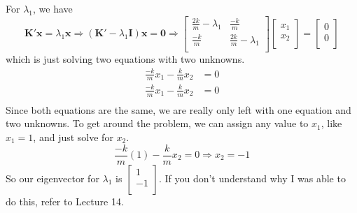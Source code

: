 \documentclass{article}
\newcommand{\be}{\begin{equation}}
\newcommand{\ee}{\end{equation}}
\newcommand{\bk}{\textbf{K}}
\begin{document}
For $\lambda_1$, we have
\be
  \bk' \textbf{x} = \lambda_1 \textbf{x} \Longrightarrow (\bk' - \lambda_1 \textbf{I}) \textbf{x} = \textbf{0} \Longrightarrow
  \begin{bmatrix}
    \frac{2k}{m} - \lambda_1 & \frac{-k}{m} \\
    \frac{-k}{m} & \frac{2k}{m} - \lambda_1 \\
  \end{bmatrix}
  \begin{bmatrix}
    x_1 \\
    x_2 \\
  \end{bmatrix}
  =
  \begin{bmatrix}
    0 \\
    0 \\
  \end{bmatrix}
\ee
which is just solving two equations with two unknowns.
\be
  \begin{split}
    \frac{-k}{m}x_1 - \frac{k}{m}x_2 &= 0 \\
    \frac{-k}{m}x_1 - \frac{k}{m}x_2 &= 0 \\
  \end{split}
\ee
Since both equations are the same, we are really only left with one equation and two unknowns. To get around the problem, we can assign any value to $x_1$, like $x_1 = 1$, and just solve for $x_2$.
\be
  \frac{-k}{m}(1) - \frac{k}{m}x_2 = 0 \Longrightarrow x_2 = -1
\ee
So our eigenvector for $\lambda_1$ is $\begin{bmatrix} 1 \\ -1 \\ \end{bmatrix}$. If you don't understand why I was able to do this, refer to Lecture 14.
\end{document}
